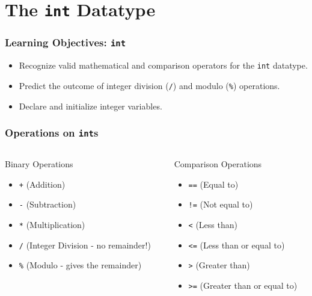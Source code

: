 \documentclass{beamer}
\begin{document}
\section{The \texttt{int} Datatype}

\begin{frame}
\frametitle{Learning Objectives: \texttt{int}}
\begin{itemize}
    \item Recognize valid mathematical and comparison operators for the \texttt{int} datatype.
    \item Predict the outcome of integer division (\texttt{/}) and modulo (\texttt{\%}) operations.
    \item Declare and initialize integer variables.
\end{itemize}
\end{frame}

\begin{frame}
\frametitle{Operations on \texttt{int}s}
\begin{columns}[T]
    \begin{column}{0.5\textwidth}
        \begin{alertblock}{Binary Operations}
        \begin{itemize}
            \item \texttt{+} (Addition)
            \item \texttt{-} (Subtraction)
            \item \texttt{*} (Multiplication)
            \item \texttt{/} (Integer Division - no remainder!)
            \item \texttt{\%} (Modulo - gives the remainder)
        \end{itemize}
        \end{alertblock}
    \end{column}
    \begin{column}{0.5\textwidth}
        \begin{exampleblock}{Comparison Operations}
        \begin{itemize}
            \item \texttt{==} (Equal to)
            \item \texttt{!=} (Not equal to)
            \item \texttt{<} (Less than)
            \item \texttt{<=} (Less than or equal to)
            \item \texttt{>} (Greater than)
            \item \texttt{>=} (Greater than or equal to)
        \end{itemize}
        \end{exampleblock}
    \end{column}
\end{columns}
\end{frame}
\end{document}
